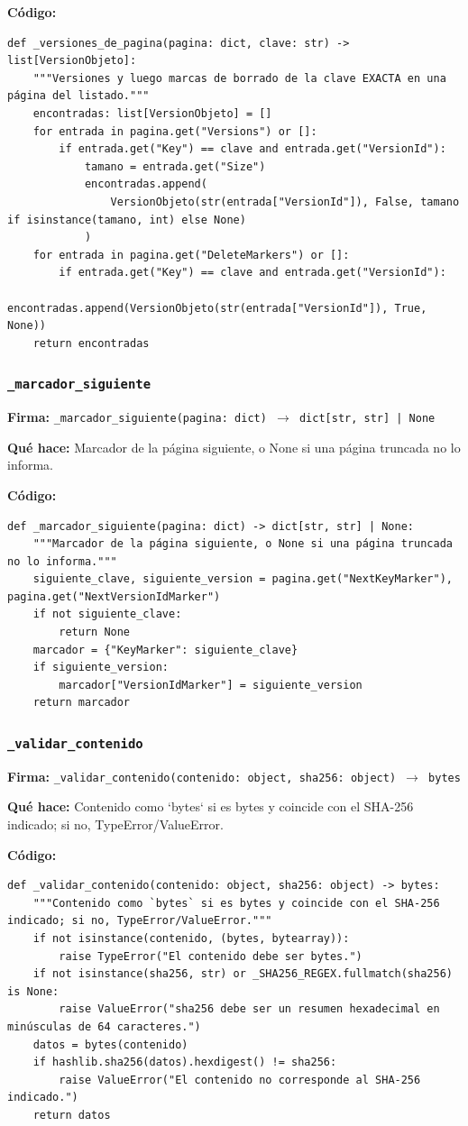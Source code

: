 \documentclass[11pt,a4paper]{article}
\begin{document}
\textbf{Código:}
\begin{lstlisting}
def _versiones_de_pagina(pagina: dict, clave: str) -> list[VersionObjeto]:
    """Versiones y luego marcas de borrado de la clave EXACTA en una página del listado."""
    encontradas: list[VersionObjeto] = []
    for entrada in pagina.get("Versions") or []:
        if entrada.get("Key") == clave and entrada.get("VersionId"):
            tamano = entrada.get("Size")
            encontradas.append(
                VersionObjeto(str(entrada["VersionId"]), False, tamano if isinstance(tamano, int) else None)
            )
    for entrada in pagina.get("DeleteMarkers") or []:
        if entrada.get("Key") == clave and entrada.get("VersionId"):
            encontradas.append(VersionObjeto(str(entrada["VersionId"]), True, None))
    return encontradas
\end{lstlisting}

\subsubsection*{\texttt{\_marcador\_siguiente}}
\textbf{Firma:} \texttt{\_marcador\_siguiente(pagina: dict) $\rightarrow$ dict[str, str] | None}

\textbf{Qué hace:} Marcador de la página siguiente, o None si una página truncada no lo informa.

\textbf{Código:}
\begin{lstlisting}
def _marcador_siguiente(pagina: dict) -> dict[str, str] | None:
    """Marcador de la página siguiente, o None si una página truncada no lo informa."""
    siguiente_clave, siguiente_version = pagina.get("NextKeyMarker"), pagina.get("NextVersionIdMarker")
    if not siguiente_clave:
        return None
    marcador = {"KeyMarker": siguiente_clave}
    if siguiente_version:
        marcador["VersionIdMarker"] = siguiente_version
    return marcador
\end{lstlisting}

\subsubsection*{\texttt{\_validar\_contenido}}
\textbf{Firma:} \texttt{\_validar\_contenido(contenido: object, sha256: object) $\rightarrow$ bytes}

\textbf{Qué hace:} Contenido como `bytes` si es bytes y coincide con el SHA-256 indicado; si no, TypeError/ValueError.

\textbf{Código:}
\begin{lstlisting}
def _validar_contenido(contenido: object, sha256: object) -> bytes:
    """Contenido como `bytes` si es bytes y coincide con el SHA-256 indicado; si no, TypeError/ValueError."""
    if not isinstance(contenido, (bytes, bytearray)):
        raise TypeError("El contenido debe ser bytes.")
    if not isinstance(sha256, str) or _SHA256_REGEX.fullmatch(sha256) is None:
        raise ValueError("sha256 debe ser un resumen hexadecimal en minúsculas de 64 caracteres.")
    datos = bytes(contenido)
    if hashlib.sha256(datos).hexdigest() != sha256:
        raise ValueError("El contenido no corresponde al SHA-256 indicado.")
    return datos
\end{lstlisting}
\end{document}
